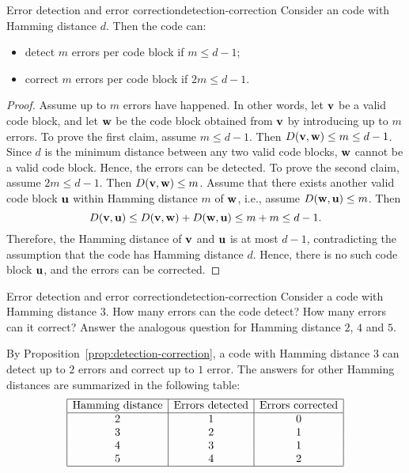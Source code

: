 \begin{proposition}{Error detection and error correction}{detection-correction}
  Consider an code with Hamming distance $d$. Then the code can:
  \begin{itemize}
  \item detect $m$ errors per code block if $m\leq d-1$;
  \item correct $m$ errors per code block if $2m\leq d-1$. 
  \end{itemize}
\end{proposition}

\begin{proof}
  Assume up to $m$ errors have happened. In other words, let
  $\mbox{\bf v}$ be a valid code block, and let $\mbox{\bf w}$ be the code
  block obtained from $\mbox{\bf v}$ by introducing up to $m$ errors.  To
  prove the first claim, assume $m\leq d-1$.  Then
  $D(\mbox{\bf v},\mbox{\bf w})\leq m\leq d-1$. Since $d$ is the minimum
  distance between any two valid code blocks, $\mbox{\bf w}$ cannot be a
  valid code block. Hence, the errors can be detected.  To prove the
  second claim, assume $2m\leq d-1$. Then
  $D(\mbox{\bf v},\mbox{\bf w})\leq m$. Assume that there exists another
  valid code block $\mbox{\bf u}$ within Hamming distance $m$ of
  $\mbox{\bf w}$, i.e., assume $D(\mbox{\bf w},\mbox{\bf u})\leq m$. Then
  \begin{equation*}
    D(\mbox{\bf v},\mbox{\bf u}) \leq D(\mbox{\bf v},\mbox{\bf w}) +
    D(\mbox{\bf w},\mbox{\bf u}) \leq m+m \leq d-1.
  \end{equation*}
  Therefore, the Hamming distance of $\mbox{\bf v}$ and $\mbox{\bf u}$ is at
  most $d-1$, contradicting the assumption that the code has Hamming
  distance $d$. Hence, there is no such code block $\mbox{\bf u}$, and the
  errors can be corrected.
\end{proof}

\begin{example}{Error detection and error correction}{detection-correction}
  Consider a code with Hamming distance $3$. How many errors can
  the code detect? How many errors can it correct? Answer the
  analogous question for Hamming distance $2$, $4$ and $5$.
\end{example}

\begin{solution}
  By Proposition~\ref{prop:detection-correction}, a code with Hamming
  distance $3$ can detect up to $2$ errors and correct up to $1$
  error. The answers for other Hamming distances are summarized in the
  following table:
  \begin{equation*}
    \begin{array}{|c|c|c|}
      \hline
      \mbox{Hamming distance} & \mbox{Errors detected} & \mbox{Errors corrected} \\\hline
      2 & 1 & 0 \\
      3 & 2 & 1 \\
      4 & 3 & 1 \\
      5 & 4 & 2 \\
      \hline
    \end{array}
  \end{equation*}
\end{solution}

